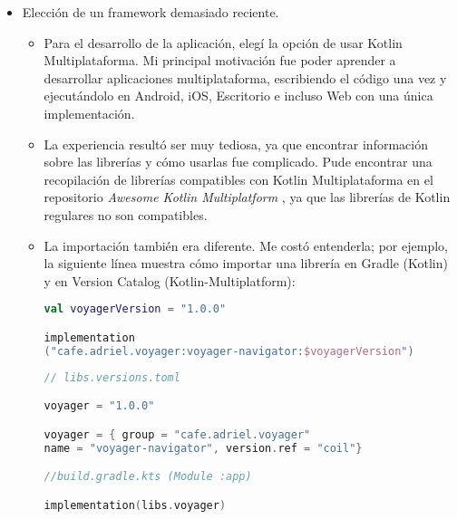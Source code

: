 \documentclass[12pt,twoside,titlepage]{report}
\begin{document}
\begin{itemize}

	\item Elección de un framework demasiado reciente.

	      \begin{itemize}

		      \item Para el desarrollo de la aplicación, elegí la opción de usar Kotlin Multiplataforma. Mi principal motivación fue poder aprender a desarrollar aplicaciones multiplataforma, escribiendo el código una vez y ejecutándolo en Android, iOS, Escritorio e incluso Web con una única implementación.


		      \item La experiencia resultó ser muy tediosa, ya que encontrar información sobre las librerías y cómo usarlas fue complicado. Pude encontrar una recopilación de librerías compatibles con Kotlin Multiplataforma en el repositorio \textit{Awesome Kotlin Multiplatform} \cite{kmp-awesome}, ya que las librerías de Kotlin regulares no son compatibles.

		      \item La importación también era diferente. Me costó entenderla; por ejemplo, la siguiente línea muestra cómo importar una librería en Gradle (Kotlin) y en Version Catalog (Kotlin-Multiplatform):

		            \begin{lstlisting}[caption={Ejemplo de importación de librerías en Gradle.}, label={alg:gradle.kts-examples}, language=Kotlin]
val voyagerVersion = "1.0.0"

implementation
("cafe.adriel.voyager:voyager-navigator:$voyagerVersion")
\end{lstlisting}

		            \begin{lstlisting}[caption={Ejemplo de importación de librerías en Version Catalog.}, label={alg:libs.versions.kts-examples}, language=Kotlin]
// libs.versions.toml					

voyager = "1.0.0"

voyager = { group = "cafe.adriel.voyager"  
name = "voyager-navigator", version.ref = "coil"}

//build.gradle.kts (Module :app)

implementation(libs.voyager)
\end{lstlisting}


\end{itemize}
\end{itemize}
\end{document}
